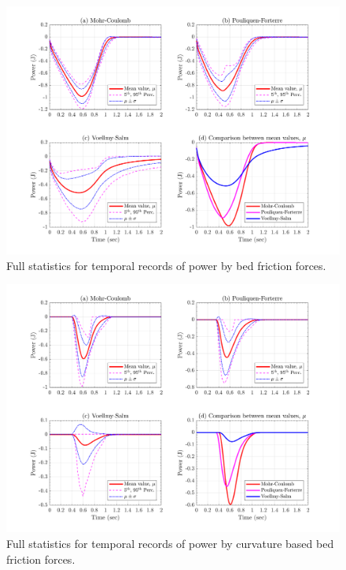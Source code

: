 \documentclass{article}
\begin{document}
\begin{figure}[H]
        \centering
        \includegraphics[width=1\textwidth]{InclinedPlane/GlobalRecords/Pbed.png}
        \caption{Full statistics for temporal records of power by bed friction forces.}
        \label{fig:Ramp-Pbed}
\end{figure}

\begin{figure}[H]
        \centering
        \includegraphics[width=1\textwidth]{InclinedPlane/GlobalRecords/Pbedc.png}
        \caption{Full statistics for temporal records of power by curvature based bed friction forces.}
        \label{fig:Ramp-Pbedc}
\end{figure}
\end{document}
